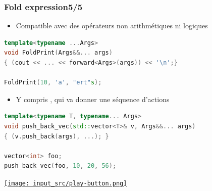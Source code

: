 \documentclass[C++.tex]{subfiles}
\begin{document}
\begin{frame}[fragile]
	\frametitle{Fold expression\titlehfill{}5/5}
	\begin{itemize}
		\item Compatible avec des opérateurs non arithmétiques ni logiques
	\end{itemize}

	\begin{lstlisting}[language=C++]
template<typename ...Args>
void FoldPrint(Args&&... args)
{ (cout << ... << forward<Args>(args)) << '\n';}

FoldPrint(10, 'a', "ert"s);\end{lstlisting}

	\begin{itemize}
		\item Y compris \og ,\fg{} qui va donner une séquence d'actions
	\end{itemize}

	\begin{lstlisting}[language=C++]
template<typename T, typename... Args>
void push_back_vec(std::vector<T>& v, Args&&... args)
{ (v.push_back(args), ...); }

vector<int> foo;
push_back_vec(foo, 10, 20, 56);\end{lstlisting}

	\hfill
	\href{https://godbolt.org/#z:OYLghAFBqd5QCxAYwPYBMCmBRdBLAF1QCcAaPECAMzwBtMA7AQwFtMQByARg9KtQYEAysib0QXACx8BBAKoBnTAAUAHpwAMvAFYTStJg1DIApACYAQuYukl9ZATwDKjdAGFUtAK4sGe1wAyeAyYAHI%2BAEaYxCAA7GakAA6oCoRODB7evnrJqY4CQSHhLFEx8baY9vkMQgRMxASZPn5cFVXptfUEhWGR0XEJCnUNTdmtQ109xaUDAJS2qF7EyOwc5gDMwcjeWADUJutuTkPEmKwH2CYaAIIbWzuY%2B4cnwcAXV7dmmwzbXnsHbgAbpgHCR3jcPl5UkZdsw2ApEkwVrshugQCBaIRomIFAcrBCbgRMCxEgYiQCCABPRKMViYAB0jN212IwFx60uNwiqE8uzEtAgLLZjPpfNZClmHxMsXx112u1OBCWDF2EBF%2BzMADZzJqxWzJetZdKACJSwnE0lMcmHKk0uEMplC9mc660ATAXZumEKHyC8Xq%2Br6qUyj7yxXK1WBhQaiy7EUGo2xU0E65EklkzAU6m0tjqp3g67oRYReie/CAv3CplRyUQkM3MOYJXEFVqpkAej1ErxweTt3N6atmZt2ftefFBaLXhLj2I5crCgD4trt3rcoVTYjECju078Z7db7HzTlutbltOceIvzHI%2BgNQeHQuwAYp50MpiMECAudTql0G61leUIFRdE0C8AgnjcAE4yZAEYNAkB%2BGIAB3ep0ABG9sG3ZdZigmCwDWABWNwGEIg9VyPAdT2Hc9RzpXYABVSF2C8x0dCdbxue9H12RIoQQAB9CIkQAa0E4FkBAgg0RASSiGIAFGPeLVdkBFj8y1P9q2XYMgNVQF6X4hQhJE5BRJw/UWP3Q1ezNa4v12FgmGCCAV2lfSPNDeUURksDFkg%2BDDl82TuU8MREgQJh8OC/kIAIYgvEwFiEqSlLEuS3YqBxTA8KCtxdnIkiyLWWyG32JN7PlLzyvlRDwMCw4EN9VpdgSXZ1hYyQ8qa4KitI8iyvXE0qoq/S6r8lAApigraHnLh6Q0FizEWlj1kWnroL6jhCp2/KFXm1a2qO9aNE2gjiIG0rPMqlNqrXHyXzfD8vwgLglt2phCJY8wzGiAhfu7Ib7qo4aHp8xD5LBQ4vwuLKeQox7jNMsSJJBageRY97lo%2BojNQTUb5WQ7cINQXY8F2EB4dQFdHpq9dHvq6b9op/bCN2xGfJG2qQv8iCZo54rBpuo9buuDh5loTgiN4PwOC0UhUE4aDLGsFFFmWR4Nh4UgCE0CX5lEkAiKWqWOEkWX9cVzheAUEAlr1%2BWJdIOBYCQTBVBBUmyAoSyFGUQxKiEBBUBQuWdbQEk6CtdIA5CWhg9DuWFcjxI6H6YAuC4BJU/T4gAHkIMTsOrY9kEnRt0gy%2BQWp8Dl3h%2BEEEQxHYKQZEERQVHUJ3SF0VoDCMFBrGsfQ8AiO3YHtEAwqGUhgRibhYhl2Z5lQRJqjtjgAFpUQOY1TFVywuFiW2NZWPRUWCOOg5DkvuF4BLMFWHWUOIJhEn1yXpctnulY4bBPbIG9rsVQAAOTUW9NSSF2MAZAyBdhZ3pGYVUKsrCWBYrgQgJANTrC4LMB%2Bn95gIDOFgGIblSBGxNvoTgFtSDJ14H/W29tdaEOoRwMwP8FaMJYU7Fec9oipGcJIIAA%3D%3D}{\texttt{[image: input\_src/play-button.png]}}
\end{frame}
\end{document}
